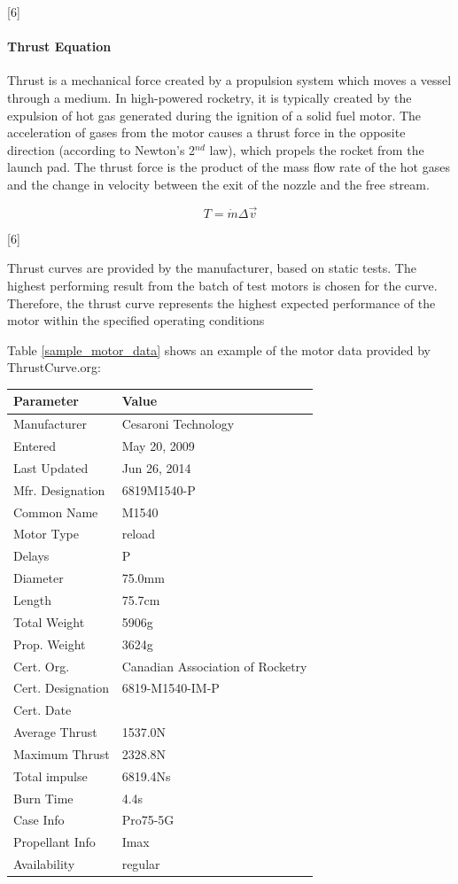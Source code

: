 \documentclass[]{article}
\let\oldparagraph\paragraph
\renewcommand{\paragraph}[1]{\oldparagraph{#1}\mbox{}}
\begin{document}
{[}6{]}

\paragraph{Thrust Equation}\label{thrust-equation}

Thrust is a mechanical force created by a propulsion system which moves
a vessel through a medium. In high-powered rocketry, it is typically
created by the expulsion of hot gas generated during the ignition of a
solid fuel motor. The acceleration of gases from the motor causes a
thrust force in the opposite direction (according to Newton's 2\(^{nd}\)
law), which propels the rocket from the launch pad. The thrust force is
the product of the mass flow rate of the hot gases and the change in
velocity between the exit of the nozzle and the free stream.

\begin{equation} 
T = \dot{m} \Delta \vec{v} 
\end{equation}

{[}6{]}

Thrust curves are provided by the manufacturer, based on static tests.
The highest performing result from the batch of test motors is chosen
for the curve. Therefore, the thrust curve represents the highest
expected performance of the motor within the specified operating
conditions

Table \ref{sample_motor_data} shows an example of the motor data
provided by ThrustCurve.org:

\begin{longtable}[c]{@{}ll@{}}
\toprule
Parameter & Value\tabularnewline
\midrule
\endhead
Manufacturer & Cesaroni Technology\tabularnewline
Entered & May 20, 2009\tabularnewline
Last Updated & Jun 26, 2014\tabularnewline
Mfr. Designation & 6819M1540-P\tabularnewline
Common Name & M1540\tabularnewline
Motor Type & reload\tabularnewline
Delays & P\tabularnewline
Diameter & 75.0mm\tabularnewline
Length & 75.7cm\tabularnewline
Total Weight & 5906g\tabularnewline
Prop. Weight & 3624g\tabularnewline
Cert. Org. & Canadian Association of Rocketry\tabularnewline
Cert. Designation & 6819-M1540-IM-P\tabularnewline
Cert. Date &\tabularnewline
Average Thrust & 1537.0N\tabularnewline
Maximum Thrust & 2328.8N\tabularnewline
Total impulse & 6819.4Ns\tabularnewline
Burn Time & 4.4s\tabularnewline
Case Info & Pro75-5G\tabularnewline
Propellant Info & Imax\tabularnewline
Availability & regular\tabularnewline
\bottomrule
\end{longtable}
\end{document}
